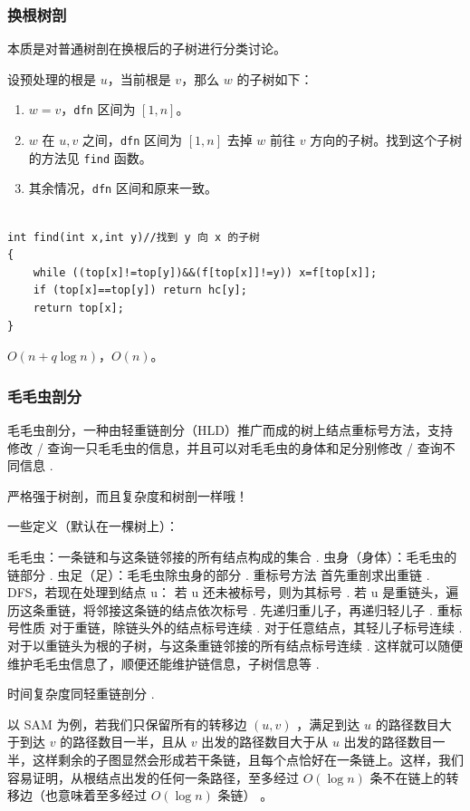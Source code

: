 \documentclass[12pt]{ctexart}
\begin{document}
\subsubsection{换根树剖}

本质是对普通树剖在换根后的子树进行分类讨论。

设预处理的根是 $u$，当前根是 $v$，那么 $w$ 的子树如下：

\begin{enumerate}
	\item $w=v$，\verb|dfn| 区间为 $[1,n]$。
	\item $w$ 在 $u,v$ 之间，\verb|dfn| 区间为 $[1,n]$ 去掉 $w$ 前往 $v$ 方向的子树。找到这个子树的方法见 \verb|find| 函数。
	\item 其余情况，\verb|dfn| 区间和原来一致。
\end{enumerate}

\begin{lstlisting}

int find(int x,int y)//找到 y 向 x 的子树
{
	while ((top[x]!=top[y])&&(f[top[x]]!=y)) x=f[top[x]];
	if (top[x]==top[y]) return hc[y];
	return top[x];
}
\end{lstlisting}
$O(n+q\log n)$，$O(n)$。


\subsubsection{毛毛虫剖分}
毛毛虫剖分，一种由轻重链剖分（HLD）推广而成的树上结点重标号方法，支持修改 / 查询一只毛毛虫的信息，并且可以对毛毛虫的身体和足分别修改 / 查询不同信息 .

严格强于树剖，而且复杂度和树剖一样哦！

一些定义（默认在一棵树上）：

毛毛虫：一条链和与这条链邻接的所有结点构成的集合 .
虫身（身体）：毛毛虫的链部分 .
虫足（足）：毛毛虫除虫身的部分 .
重标号方法
首先重剖求出重链 .
DFS，若现在处理到结点 u：
若 u 还未被标号，则为其标号 .
若 u 是重链头，遍历这条重链，将邻接这条链的结点依次标号 .
先递归重儿子，再递归轻儿子 .
重标号性质
对于重链，除链头外的结点标号连续 .
对于任意结点，其轻儿子标号连续 .
对于以重链头为根的子树，与这条重链邻接的所有结点标号连续 .
这样就可以随便维护毛毛虫信息了，顺便还能维护链信息，子树信息等 .

时间复杂度同轻重链剖分 .

以 SAM 为例，若我们只保留所有的转移边 $(u,v)$ ，满足到达 $u$ 的路径数目大于到达 $v$ 的路径数目一半，且从 $v$ 出发的路径数目大于从 $u$ 出发的路径数目一半，这样剩余的子图显然会形成若干条链，且每个点恰好在一条链上。这样，我们容易证明，从根结点出发的任何一条路径，至多经过 $O(\log n)$ 条不在链上的转移边（也意味着至多经过 $O(\log n)$ 条链） 。
\end{document}
